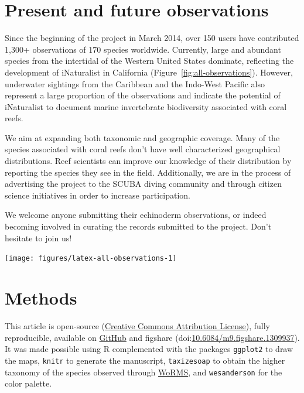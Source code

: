 \documentclass[11pt]{article}\usepackage[]{graphicx}\usepackage[]{color}
\newenvironment{knitrout}{}{} %
\begin{document}
\section*{Present and future observations}

Since the beginning of the project in March 2014, over 150 users have
contributed 1,300+ observations of 170 species worldwide. Currently, large and
abundant species from the intertidal of the Western United States dominate,
reflecting the development of iNaturalist in California
(Figure~\ref{fig:all-observations}). However, underwater sightings from the
Caribbean and the Indo-West Pacific also represent a large proportion of the
observations and indicate the potential of iNaturalist to document marine
invertebrate biodiversity associated with coral reefs.

We aim at expanding both taxonomic and geographic coverage. Many of the species
associated with coral reefs don't have well characterized geographical
distributions. Reef scientists can improve our knowledge of their distribution
by reporting the species they see in the field. Additionally, we are in the
process of advertising the project to the SCUBA diving community and through
citizen science initiatives in order to increase participation.

We welcome anyone submitting their echinoderm observations, or indeed becoming
involved in curating the records submitted to the project. Don't hesitate to
join us!

\begin{center}
\begin{knitrout}
\color{fgcolor}
\texttt{[image: figures/latex-all-observations-1]} 

\end{knitrout}
\label{fig:all-observations}
\end{center}

\section*{Methods}

{\small This article is open-source
  (\href{http://creativecommons.org/licenses/by/4.0/}{Creative Commons
    Attribution License}), fully reproducible, available on
  \href{https://github.com/fmichonneau/inat-paper/}{GitHub} and figshare
  (doi:\href{http://dx.doi.org/10.6084/m9.figshare.1309937}{10.6084/m9.figshare.1309937}). It
  was made possible using R \citep{Rproject} complemented with the packages
  \texttt{ggplot2} \citep{Wickham2009} to draw the maps, \texttt{knitr}
  \citep{Xie2014} to generate the manuscript, \texttt{taxizesoap}
  \citep{Chamberlain2013,Chamberlain2014} to obtain the higher taxonomy of the
  species observed through \href{http://marinespecies.org/}{WoRMS}, and
  \texttt{wesanderson} \citep{Ram2014} for the color palette.  }




\end{document}
